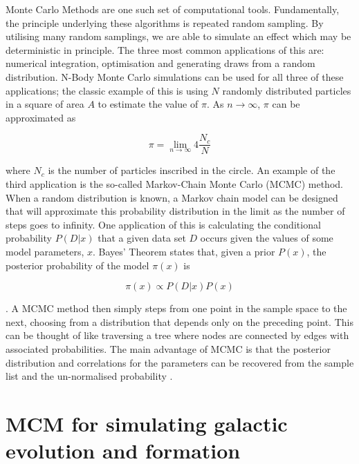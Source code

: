 \documentclass[amsmath,amssymb,reprint,
tightenlines,aps,prl,11pt]{revtex4-1}
\begin{document}
Monte Carlo Methods are one such set of computational tools. Fundamentally, the principle underlying these algorithms is repeated random sampling. By utilising many random samplings, we are able to simulate an effect which may be deterministic in principle. The three most common applications of this are: numerical integration, optimisation and generating draws from a random distribution. N-Body Monte Carlo simulations can be used for all three of these applications; the classic example of this is using $N$ randomly distributed particles in a square of area $A$ to estimate the value of $\pi$. As $n \rightarrow \infty$, $\pi$ can be approximated as

\[ \pi = \lim_{n \rightarrow \infty} 4 \frac{N_c}{N} \]

where $N_c$ is the number of particles inscribed in the circle. An example of the third application is the so-called Markov-Chain Monte Carlo (MCMC) method. When a random distribution is known, a Markov chain model can be designed that will approximate this probability distribution in the limit as the number of steps goes to infinity. One application of this is calculating the conditional probability $P(D|x)$ that a given data set $D$ occurs given the values of some model parameters, $x$. Bayes' Theorem states that, given a prior $P(x)$, the posterior probability of the model $\pi(x)$ is 

\[ \pi(x) \propto P(D|x) P(x) \]

\cite{paltaniMonteCarloMethods2011}. A MCMC method then simply steps from one point in the sample space to the next, choosing from a distribution that depends only on the preceding point. This can be thought of like traversing a tree where nodes are connected by edges with associated probabilities. The main advantage of MCMC is that the posterior distribution and correlations for the parameters can be recovered from the sample list and the un-normalised probability \cite{paltaniMonteCarloMethods2011}.

\section{MCM for simulating galactic evolution and formation}
\end{document}
